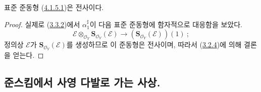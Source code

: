 \begin{proposition}[4.1.6]
\label{II.4.1.6-ko}
표준 준동형 (\hyperref[II.4.1.5.1-ko]{4.1.5.1})은 전사이다.
\end{proposition}

\begin{proof}
실제로 (\hyperref[II.3.3.2-ko]{3.3.2})에서
$\alpha_1^\sharp$이 다음 표준 준동형에 함자적으로 대응함을 보았다.
\[
  \mathcal{E}\otimes_{\mathcal{O}_Y}
  \mathbf{S}_{\mathcal{O}_Y}(\mathcal{E})
  \longrightarrow
  (\mathbf{S}_{\mathcal{O}_Y}(\mathcal{E}))(1)~;
\]
정의상 $\mathcal{E}$가 $\mathbf{S}_{\mathcal{O}_Y}(\mathcal{E})$를 생성하므로
이 준동형은 전사이며, 따라서 (\hyperref[II.3.2.4-ko]{3.2.4})에 의해
결론을 얻는다.
\end{proof}

\subsection{준스킴에서 사영 다발로 가는 사상.}
\label{subsection:II.4.2-ko}


